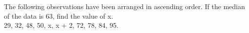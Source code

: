 The following observations have been arranged
in ascending order. If the median of the data
is 63, find the value of x.\\
29, 32, 48, 50, x, x + 2, 72, 78, 84, 95.

